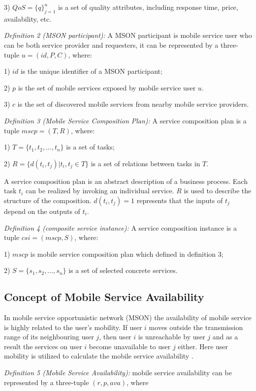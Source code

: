 \documentclass[10pt,journal,compsoc]{IEEEtran}
\begin{document}
​3) $QoS = \{q\}^n_{j=1}$ is a set of quality attributes, including response time, price, availability, etc.

\textit{Definition 2 (MSON participant):} A MSON participant is mobile service user who can be both service provider and requesters, it can be represented by a three-tuple $u = (id, P, C)$, where:

​1) $id$ is the unique identifier of a MSON participant;

​2) $p$ is the set of mobile services exposed by mobile service user $u$.

​3) $c$ is the set of discovered mobile services from nearby mobile service providers.

\textit{Definition 3 (Mobile Service Composition Plan):} A service composition plan is a tuple $mscp = (T, R)$, where:

​1) $T = \{t_1,t_2,...,t_n\}$ is a set of tasks;

​2) $R = \{d(t_i,t_j)|t_i,t_j \in T\}$ is a set of relations between tasks in $T$.

​A service composition plan is an abstract description of a business process. Each task $t_i$ can be realized by invoking an individual service. $R$ is used to describe the structure of the composition. $d(t_i, t_j) = 1$ represents that the inputs of $t_j$ depend on the outputs of $t_i$.

\textit{Definition 4 (composite service instance):} A service composition instance is a tuple $csi = (mscp, S)$, where:

​1) $mscp$ is mobile service composition plan which defined in definition 3;

​2) $S = \{s_1, s_2,...,s_n\}$ is a set of selected concrete services.

\subsection{Concept of Mobile Service Availability}
In mobile service opportunistic network (MSON) the availability of mobile service is highly related to the user’s mobility. If user $i$ moves outside the transmission range of its neighbouring user $j$, then user $i$ is unreachable by user $j$ and as a result the services on user $i$ become unavailable to user $j$ either. Here user mobility is utilized to calculate the mobile service availability \cite{Yang2010}.

\textit{Definition 5 (Mobile Service Availability):} mobile service availability can be represented by a three-tuple $(r, p, ava) $, where
\end{document}
